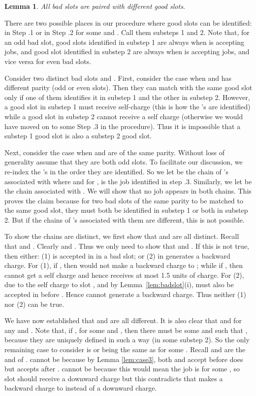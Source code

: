 \documentclass[11pt]{article}
\newtheorem{lemma}{Lemma}[section]
\newcommand{\qed}{\hspace*{\fill}\par\medskip}
\newenvironment{proof}{\noindent{\it Proof. }\ignorespaces}{\qed}
\begin{document}
\begin{lemma} \label{lem:distinct}
All bad slots are paired with different good slots.
\end{lemma}
\begin{proof}
There are two possible places in our procedure where good slots can be
identified: in Step .1 or in Step .2 for some  and .
Call them substeps 1 and 2.
Note that, for an odd bad slot, good slots identified in substep 1 are 
always when  is accepting jobs, and good slot identified in substep 2 are 
always when  is accepting jobs, and vice versa for even bad slots.

Consider two distinct bad slots  and .
First, consider the case when  and  has different parity
(odd or even slots). 
Then they can match with the same good slot only if one of them identifies it 
in substep 1 and the other in substep 2.
However, a good slot in substep 1 must receive self-charge (this is how the 
's are identified) while a good slot in substep 2
cannot receive a self charge (otherwise we would have moved on to some 
Step .3 in the procedure).  
Thus it is impossible that a substep 1 good slot is
also a substep 2 good slot.

Next, consider the case when  and  are of the same parity.
Without loss of generality assume that they are both odd slots.
To facilitate our discussion, we re-index the 's in the order
they are identified.
So we let  be the chain of 's associated with 
where 
and for ,  is the job identified in step .3.
Similarly, we let  be the chain associated with .
We will show that
no job appears in both chains.
This proves the claim because
for two bad slots of the same parity to be matched to the same good slot,
they must both be identified in substep 1 or both in substep 2.
But if the chains of 's associated with them are different,
this is not possible.

To show the chains are distinct,
we first show that  and  are all distinct.
Recall that  and .
Clearly  and .
Thus we only need to show that  and .
If this is not true, then either:
(1)  is accepted in  in a bad slot; or
(2)  in  generates a backward charge.  
For (1), if , then  
would not make a backward charge to ; while if
, then  cannot get a self 
charge and hence receives at most 1.5 units of charge.
For (2),  due to the self charge to slot , and 
by Lemma~\ref{lem:badslot}(i),  must also be accepted in  before .  
Hence  cannot generate a backward charge.
Thus neither (1) nor (2) can be true.

We have now established that  and  are all different.
It is also clear that  and  for any  and .
Note that, if , for some  and , 
then there must be some  and  such that ,
because they are uniquely defined in such a way (in some substep 2). 
So the only remaining case to consider is  or  being the same 
as  for some . 
Recall  and  are the  and  of . 
 cannot be 
because by Lemma \ref{lem:case3},
both  and  accept  before  does
but  accepts  after . 
 cannot be  because this would mean the job  is  for 
some , so slot  should receive a downward charge 
but this contradicts that  makes a backward charge to  
instead of a downward charge. 
\end{proof}
\end{document}
